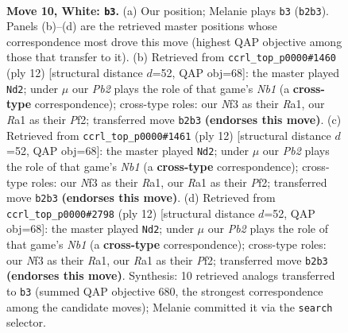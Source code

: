 \documentclass[11pt]{article}
\begin{document}
\clearpage

\begin{figure}[p]\centering
\begin{subfigure}{0.46\textwidth}\centering
\resizebox{\linewidth}{!}{%
\newchessgame
\chessboard[
  setfen={r1bqk2r/pp3pp1/4pn2/2b4p/7P/3B1N2/PPP2PP1/R1BQK2R w KQkq - 0 10},
  showmover=false,
  pgfstyle=straightmove, color=movearrow, markmove={b2-b3}
]}
\caption{}
\end{subfigure}\hfill
\begin{subfigure}{0.46\textwidth}\centering
\resizebox{\linewidth}{!}{%
\newchessgame
\chessboard[
  setfen={r1bqkb1r/pp3ppp/2p1pn2/8/4P3/3B4/PPP2PPP/RNBQK2R w KQkq - 0 7},
  showmover=false,
  pgfstyle=straightmove, color=movearrow, markmove={b1-d2}
]}
\caption{}
\end{subfigure}
\\[4pt]
\begin{subfigure}{0.46\textwidth}\centering
\resizebox{\linewidth}{!}{%
\newchessgame
\chessboard[
  setfen={r1bqkb1r/pp3ppp/2p1pn2/8/4P3/3B4/PPP2PPP/RNBQK2R w KQkq - 0 7},
  showmover=false,
  pgfstyle=straightmove, color=movearrow, markmove={b1-d2}
]}
\caption{}
\end{subfigure}\hfill
\begin{subfigure}{0.46\textwidth}\centering
\resizebox{\linewidth}{!}{%
\newchessgame
\chessboard[
  setfen={r1bqkb1r/pp3ppp/2p1pn2/8/4P3/3B4/PPP2PPP/RNBQK2R w KQkq - 0 7},
  showmover=false,
  pgfstyle=straightmove, color=movearrow, markmove={b1-d2}
]}
\caption{}
\end{subfigure}
\caption{\textbf{Move 10, White: \texttt{b3}.} (a) Our position; Melanie plays \texttt{b3} (\texttt{b2b3}). Panels (b)--(d) are the retrieved master positions whose correspondence most drove this move (highest QAP objective among those that transfer to it). (b) Retrieved from \texttt{ccrl\_top\_p0000\#1460} (ply 12) [structural distance $d$=52, QAP obj=68]: the master played \texttt{Nd2}; under $\mu$ our \emph{Pb2} plays the role of that game's \emph{Nb1} (a \textbf{cross-type} correspondence); cross-type roles: our \emph{N}f3 as their \emph{R}a1, our \emph{R}a1 as their \emph{P}f2; transferred move \texttt{b2b3} \textbf{(endorses this move)}. (c) Retrieved from \texttt{ccrl\_top\_p0000\#1461} (ply 12) [structural distance $d$=52, QAP obj=68]: the master played \texttt{Nd2}; under $\mu$ our \emph{Pb2} plays the role of that game's \emph{Nb1} (a \textbf{cross-type} correspondence); cross-type roles: our \emph{N}f3 as their \emph{R}a1, our \emph{R}a1 as their \emph{P}f2; transferred move \texttt{b2b3} \textbf{(endorses this move)}. (d) Retrieved from \texttt{ccrl\_top\_p0000\#2798} (ply 12) [structural distance $d$=52, QAP obj=68]: the master played \texttt{Nd2}; under $\mu$ our \emph{Pb2} plays the role of that game's \emph{Nb1} (a \textbf{cross-type} correspondence); cross-type roles: our \emph{N}f3 as their \emph{R}a1, our \emph{R}a1 as their \emph{P}f2; transferred move \texttt{b2b3} \textbf{(endorses this move)}. Synthesis: 10 retrieved analogs transferred to \texttt{b3} (summed QAP objective 680, the strongest correspondence among the candidate moves); Melanie committed it via the \texttt{search} selector.}
\label{fig:thought-m18}
\end{figure}
\end{document}
